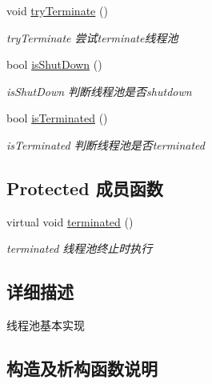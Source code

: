 \begin{DoxyCompactItemize}
\mbox{\label{classThreadPoolExecutor_aaf794e9f8f8537f221ddff130129fee6}} 
void \hyperlink{classThreadPoolExecutor_aaf794e9f8f8537f221ddff130129fee6}{try\+Terminate} ()
\begin{DoxyCompactList}\small\item\em try\+Terminate 尝试terminate线程池 \end{DoxyCompactList}\item 
bool \hyperlink{classThreadPoolExecutor_ab2306274cb488e3bcf4d14f6042373f7}{is\+Shut\+Down} ()
\begin{DoxyCompactList}\small\item\em is\+Shut\+Down 判断线程池是否shutdown \end{DoxyCompactList}\item 
bool \hyperlink{classThreadPoolExecutor_a50e41a2102a9c5193b419e382f383620}{is\+Terminated} ()
\begin{DoxyCompactList}\small\item\em is\+Terminated 判断线程池是否terminated \end{DoxyCompactList}\end{DoxyCompactItemize}
\subsection*{Protected 成员函数}
\begin{DoxyCompactItemize}
\item 
\mbox{\label{classThreadPoolExecutor_a61774315237123faf8e7fcc9d35ae47d}} 
virtual void \hyperlink{classThreadPoolExecutor_a61774315237123faf8e7fcc9d35ae47d}{terminated} ()
\begin{DoxyCompactList}\small\item\em terminated 线程池终止时执行 \end{DoxyCompactList}\end{DoxyCompactItemize}


\subsection{详细描述}
线程池基本实现 

\subsection{构造及析构函数说明}
\mbox{\label{classThreadPoolExecutor_adc2bbcf28a95be1ba7fea937f6ba7998}} 
